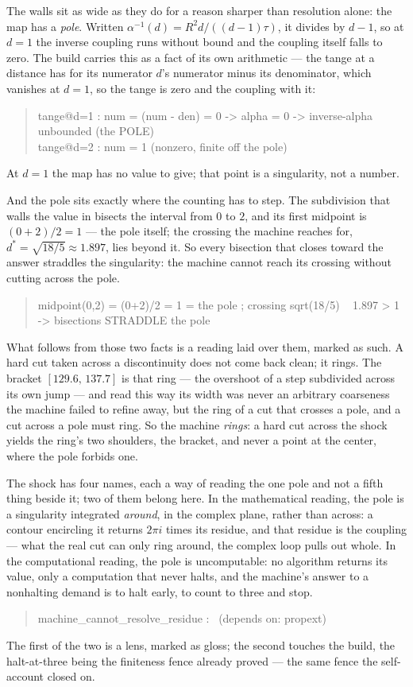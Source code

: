 The walls sit as wide as they do for a reason sharper than resolution alone: the map has a \emph{pole}.
Written $\alpha^{-1}(d) = R^{2}d/((d-1)\tau)$, it divides by $d-1$, so at $d=1$ the inverse coupling runs without bound and
the coupling itself falls to zero.
The build carries this as a fact of its own arithmetic --- the tange at a distance has for its numerator $d$'s numerator
minus its denominator, which vanishes at $d=1$, so the tange is zero and the coupling with it:
\begin{quote}\ttfamily
tange@d=1 : num = (num - den) = 0  ->  alpha = 0  ->  inverse-alpha unbounded   (the POLE)\\
tange@d=2 : num = 1                (nonzero, finite off the pole)
\end{quote}
At $d=1$ the map has no value to give; that point is a singularity, not a number.

And the pole sits exactly where the counting has to step.
The subdivision that walls the value in bisects the interval from $0$ to $2$, and its first midpoint is $(0+2)/2 = 1$
--- the pole itself; the crossing the machine reaches for, $d^{*} = \sqrt{18/5} \approx 1.897$, lies beyond it.
So every bisection that closes toward the answer straddles the singularity: the machine cannot reach its crossing without
cutting across the pole.
\begin{quote}\ttfamily
midpoint(0,2) = (0+2)/2 = 1 = the pole ;  crossing sqrt(18/5) ~ 1.897 > 1  ->  bisections STRADDLE the pole
\end{quote}

What follows from those two facts is a reading laid over them, marked as such.
A hard cut taken across a discontinuity does not come back clean; it rings.
The bracket $[129.6,\,137.7]$ is that ring --- the overshoot of a step subdivided across its own jump --- and read this
way its width was never an arbitrary coarseness the machine failed to refine away, but the ring of a cut that crosses a
pole, and a cut across a pole must ring.
So the machine \emph{rings}: a hard cut across the shock yields the ring's two shoulders, the bracket, and never a point
at the center, where the pole forbids one.

The shock has four names, each a way of reading the one pole and not a fifth thing beside it; two of them belong here.
In the mathematical reading, the pole is a singularity integrated \emph{around}, in the complex plane, rather than across:
a contour encircling it returns $2\pi i$ times its residue, and that residue is the coupling --- what the real cut can only
ring around, the complex loop pulls out whole.
In the computational reading, the pole is uncomputable: no algorithm returns its value, only a computation that never
halts, and the machine's answer to a nonhalting demand is to halt early, to count to three and stop.
\begin{quote}\ttfamily
machine\_cannot\_resolve\_residue : \ (depends on: propext)
\end{quote}
The first of the two is a lens, marked as gloss; the second touches the build, the halt-at-three being the finiteness
fence already proved --- the same fence the self-account closed on.

